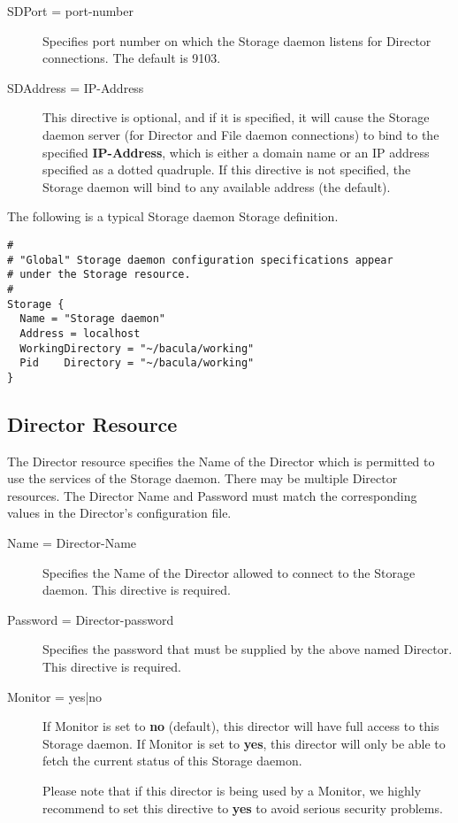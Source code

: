 \begin{description}
\item [SDPort = \lt{}port-number\gt{}]
   Specifies port number on which the Storage daemon  listens for Director
connections. The default is 9103.  

\item [SDAddress = \lt{}IP-Address\gt{}]
   This directive is optional,  and if it is specified, it will cause the Storage
daemon server (for  Director and File daemon connections) to bind to the
specified  {\bf IP-Address}, which is either a domain name or an IP address 
specified as a dotted quadruple. If this directive is not specified,  the
Storage daemon will bind to any available address (the default).  
\end{description}

The following is a typical Storage daemon Storage definition. 

\footnotesize
\begin{verbatim}
#
# "Global" Storage daemon configuration specifications appear
# under the Storage resource.
#
Storage {
  Name = "Storage daemon"
  Address = localhost
  WorkingDirectory = "~/bacula/working"
  Pid    Directory = "~/bacula/working"
}
\end{verbatim}
\normalsize

\subsection*{Director Resource}
\label{DirectorResource1}

The Director resource specifies the Name of the Director which is permitted
to use the services of the Storage daemon.  There may be multiple Director
resources.  The Director Name and Password must match the corresponding
values in the Director's configuration file.

\begin{description}

\item [Name = \lt{}Director-Name\gt{}]
   Specifies the Name of the Director allowed to connect  to the Storage daemon.
   This directive is required.  

\item [Password = \lt{}Director-password\gt{}]
   Specifies the password that must be supplied by the above named  Director.
   This directive is required.  

\item [Monitor = \lt{}yes|no\gt{}]
   If Monitor is set to {\bf no} (default), this director will have full
   access to this Storage daemon.  If Monitor is set to {\bf yes}, this
   director will only be able to fetch the current status of this Storage
   daemon.

   Please note that if this director is being used by a Monitor, we highly 
   recommend to set this directive to {\bf yes} to avoid serious security 
   problems. 

\end{description}

